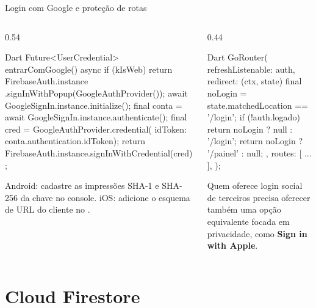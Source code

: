 \documentclass[aspectratio=169,10pt]{beamer}
\begin{document}
\begin{frame}[fragile]{Login com Google e proteção de rotas}
  \begin{columns}[T]
    \begin{column}{0.54\textwidth}
\begin{codigo}[title=Google (google\_sign\_in 7)]{Dart}
Future<UserCredential> entrarComGoogle() async {
  if (kIsWeb) {
    return FirebaseAuth.instance
        .signInWithPopup(GoogleAuthProvider());
  }
  await GoogleSignIn.instance.initialize();
  final conta = await GoogleSignIn.instance.authenticate();
  final cred = GoogleAuthProvider.credential(
      idToken: conta.authentication.idToken);
  return FirebaseAuth.instance.signInWithCredential(cred);
}
\end{codigo}
      \begin{atencao}
        Android: cadastre as impressões SHA-1 e SHA-256 da chave no console. iOS: adicione o esquema de URL do cliente no .
      \end{atencao}
    \end{column}
    \begin{column}{0.44\textwidth}
\begin{codigo}[title=go\_router (Módulo 07)]{Dart}
GoRouter(
  refreshListenable: auth,
  redirect: (ctx, state) {
    final noLogin =
        state.matchedLocation == '/login';
    if (!auth.logado) {
      return noLogin ? null : '/login';
    }
    return noLogin ? '/painel' : null;
  },
  routes: [ ... ],
);
\end{codigo}
      \begin{dica}
        Quem oferece login social de terceiros precisa oferecer também uma opção equivalente focada em privacidade, como \textbf{Sign in with Apple}.
      \end{dica}
    \end{column}
  \end{columns}
\end{frame}

\section{Cloud Firestore}
\end{document}

